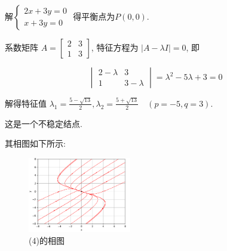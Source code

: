 \documentclass{article}
\begin{document}
\begin{enumerate}[label=(\arabic*)]
    解$
    \begin{cases}
        2x + 3y = 0 \\
        x + 3y = 0
    \end{cases}
    $
    得平衡点为$P(0, 0)$.

    系数矩阵 $A = \begin{bmatrix} 2 & 3 \\ 1 & 3 \end{bmatrix}$,
    特征方程为 $|A - \lambda I| = 0$, 即

    $$
    \begin{vmatrix}
        2 - \lambda & 3 \\
        1 & 3 - \lambda
    \end{vmatrix} = \lambda^2 - 5\lambda + 3 = 0
    $$

    解得特征值 $\lambda_1 = \frac{5 - \sqrt{13}}{2}, \lambda_2 = \frac{5 + \sqrt{13}}{2}\quad (p=-5, q=3)$.

    这是一个不稳定结点.

    其相图如下所示:

    \begin{figure}[H]
        \centering
        \includegraphics[width=0.4\textwidth]{img/4.png}
        \caption{(4)的相图}
    \end{figure}
\end{enumerate}
\end{document}
